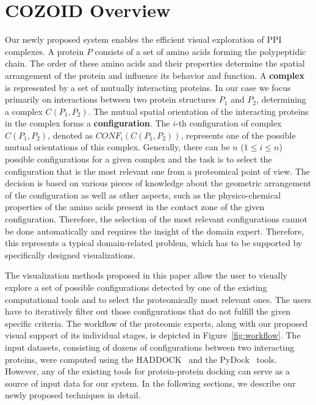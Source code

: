 \documentclass{bmcart}
\begin{document}
\section{COZOID Overview}
Our newly proposed system enables the efficient visual exploration of PPI complexes.
A protein $P$ consists of a set of amino acids forming the polypeptidic chain.
The order of these amino acids and their properties determine the spatial arrangement of the protein and influence its behavior and function.
A \textbf{complex} is represented by a set of mutually interacting proteins.
In our case we focus primarily on interactions between two protein structures $P_1$ and $P_2$, determining a complex $C(P_1,P_2)$.
The mutual spatial orientation of the interacting proteins in the complex forms a \textbf{configuration}.
The $i$-th configuration of complex $C(P_1,P_2)$, denoted as $CONF_i(C(P_1,P_2))$, represents one of the possible mutual orientations of this complex.
Generally, there can be $n$ ($1 \leq i \leq n$) possible configurations for a given complex and the task is to select the configuration that is the most relevant one from a proteomical point of view.
The decision is based on various pieces of knowledge about the geometric arrangement of the configuration as well as other aspects, such as the physico-chemical properties of the amino acids present in the contact zone of the given configuration.
Therefore, the selection of the most relevant configurations cannot be done automatically and requires the insight of the domain expert.
Therefore, this represents a typical domain-related problem, which has to be supported by specifically designed visualizations.

The visualization methods proposed in this paper allow the user to visually explore a set of possible configurations detected by one of the existing computational tools and to select the proteomically most relevant ones.
The users have to iteratively filter out those configurations that do not fulfill the given specific criteria.
The workflow of the proteomic experts, along with our proposed visual support of its individual stages, is depicted in Figure~\ref{fig:workflow}.
The input datasets, consisting of dozens of configurations between two interacting proteins, were computed using the HADDOCK~\cite{haddock} and the PyDock~\cite{pydock} tools. 
However, any of the existing tools for protein-protein docking can serve as a source of input data for our system.
In the following sections, we describe our newly proposed techniques in detail.
\end{document}
